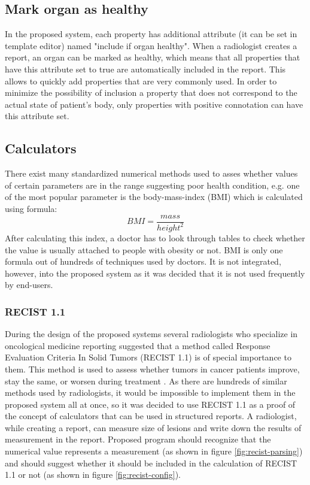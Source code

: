 \documentclass[12pt, twoside, openany]{report}
\theoremstyle{definition}
\begin{document}
\subsection{Mark organ as healthy}
In the proposed system, each property has additional attribute (it can be set in template editor) named "include if organ healthy". When a radiologist creates a report, an organ can be marked as healthy, which means that all properties that have this attribute set to true are automatically included in the report. This allows to quickly add properties that are very commonly used. 
In order to minimize the possibility of inclusion a property that does not correspond to the actual state of patient's body, only properties with positive connotation can have this attribute set. 

\subsection{Calculators}
There exist many standardized numerical methods used to asses whether values of certain parameters are in the range suggesting poor health condition, e.g. one of the most popular parameter is the body-mass-index (BMI) which is calculated using formula:
\begin{equation}
BMI=\frac{mass}{height^2}
\end{equation} 
After calculating this index, a doctor has to look through tables to check whether the value is usually attached to people with obesity or not. 
BMI is only one formula out of hundreds of techniques used by doctors. It is not integrated, however, into the proposed system as it was decided that it is not used frequently by end-users.

\subsubsection{RECIST 1.1}
During the design of the proposed systems several radiologists who specialize in oncological medicine reporting suggested that a method called  Response Evaluation Criteria In Solid Tumors (RECIST 1.1) is of special importance to them. This method is used to assess whether tumors in cancer patients improve, stay the same, or worsen during treatment \cite{wiki-recist}. As there are hundreds of similar methods used by radiologists, it would be impossible to implement them in the proposed system all at once, so it was decided to use RECIST 1.1 as a proof of the concept of calculators that can be used in structured reports.
A radiologist, while creating a report, can measure size of lesions and write down the results of measurement in the report. Proposed program should recognize that the numerical value represents a measurement (as shown in figure \ref{fig:recist-parsing}) and should suggest whether it should be included in the calculation of RECIST 1.1 or not (as shown in figure \ref{fig:recist-config}).
\end{document}
